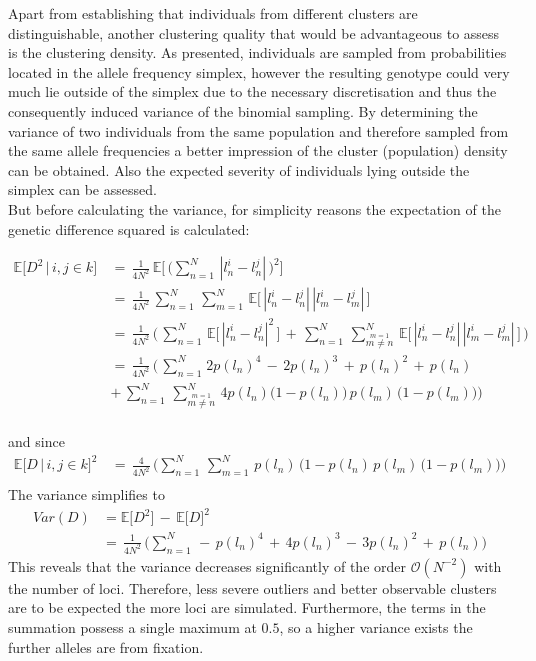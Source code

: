 \documentclass[a4paper, 11pt]{article}
\begin{document}
Apart from establishing that individuals from different clusters are distinguishable, another clustering quality that would be advantageous to assess is the clustering density. As presented, individuals are sampled from probabilities located in the allele frequency simplex, however the resulting genotype could very much lie outside of the simplex due to the necessary discretisation and thus the consequently induced variance of the binomial sampling. 
By determining the variance of two individuals from the same population and therefore sampled from the same allele frequencies a better impression of the cluster (population) density can be obtained. Also the expected severity of individuals lying outside the simplex can be assessed.\\
But before calculating the variance, for simplicity reasons the expectation of the genetic difference squared is calculated:

\begin{align*}
\mathbb{E}\big[D^2\,|\,i,j \in k\big]\, &=\, \frac{1}{4N^2}\, \mathbb{E}\bigg[\,\big(\sum^{N}_{n = 1}\, |l^i_n - l^j_n|\,\big)^2\bigg] \\
&=\, \frac{1}{4N^2}\, \sum^{N}_{n = 1}\,\sum^{N}_{m = 1}\,\mathbb{E}\big[\, |l^i_n - l^j_n|\,|l^i_m - l^j_m|\,\big] \\
&=\, \frac{1}{4N^2}\,\bigg(\, \sum^{N}_{n = 1}\, \mathbb{E}\big[\,|l^i_n - l^j_n|^2\,\big]\, +\, \sum^{N}_{n = 1}\,\sum^{N}_{\overset{m = 1}{m \neq n}}\, \mathbb{E}\big[\,|l^i_n - l^j_n|\,|l^i_m - l^j_m|\,\big]\,\bigg) \\
&=\, \frac{1}{4N^2}\,\bigg(\, \sum^{N}_{n = 1\,}2p(l_n)^4\, -\, 2p(l_n)^3\, +\, p(l_n)^2\, +\, p(l_n)\\ \, &+\, \sum^{N}_{n = 1}\, \sum^{N}_{\overset{m = 1}{m \neq n}}\,  4p(l_n)\big(1-p(l_n)\big) \, p(l_m)\,\big(1-p(l_m)\big)\bigg) \\
\end{align*}

and since
\begin{align*}
\mathbb{E}\big[D\, |\,i,j \in k\big]^2\, &=\, \frac{4}{4N^2}\,\bigg( \sum^{N}_{n = 1}\, \sum^{N}_{m = 1}\, p(l_n)\, (1-p(l_n)\, p(l_m)\, \big(1-p(l_m)\big)\bigg)\\
\end{align*}
The variance simplifies to
\begin{align*}
Var(D) &= \mathbb{E}\big[D^2\big]\, -\, \mathbb{E}\big[D\big]^2\\
&=\, \frac{1}{4N^2}\, \bigg(\sum^{N}_{n = 1}\, -\,p(l_n)^4\,+\,4p(l_n)^3\,-\,3p(l_n)^2\,+\,p(l_n)\bigg)
\end{align*}
This reveals that the variance decreases significantly of the order $\mathcal{O}(N^{-2})$ with the number of loci. Therefore, less severe outliers and better observable clusters are to be expected the more loci are simulated. Furthermore, the terms in the summation possess a single maximum at $0.5$, so a higher variance exists the further alleles are from fixation.
\end{document}
